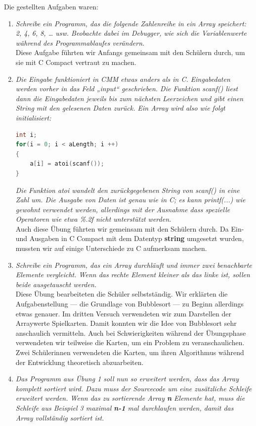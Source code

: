 Die gestellten Aufgaben waren:
\begin{enumerate}
\item \emph{Schreibe ein Programm, das die folgende Zahlenreihe in ein Array speichert: 2, 4, 6, 8, … usw. Beobachte dabei im Debugger, wie sich die Variablenwerte während des Programmablaufes verändern.}\\
Diese Aufgabe führten wir Anfangs gemeinsam mit den Schülern durch, um sie mit C Compact vertraut zu machen.

\item \emph{Die Eingabe funktioniert in CMM etwas anders als in C. Eingabedaten werden vorher in das Feld „input“ geschrieben. Die Funktion scanf() liest dann die Eingabedaten jeweils bis zum nächsten Leerzeichen und gibt einen String mit den gelesenen Daten zurück. Ein Array wird also wie folgt initialisiert:}
\begin{lstlisting}[language=C]
int i;
for(i = 0; i < aLength; i ++)
{
    a[i] = atoi(scanf());
}
\end{lstlisting}
\emph{Die Funktion atoi wandelt den zurückgegebenen String von scanf() in eine Zahl um.
Die Ausgabe von Daten ist genau wie in C; es kann printf(...) wie gewohnt verwendet werden, allerdings mit der Ausnahme dass spezielle Operatoren wie etwa \glqq{}\%.2f\grqq{} nicht unterstützt werden.}\\
Auch diese Übung führten wir gemeinsam mit den Schülern durch. Da Ein- und Ausgaben in C Compact mit dem Datentyp \textbf{string} umgesetzt wurden, mussten wir auf einige Unterschiede zu C aufmerksam machen.

\item \emph{Schreibe ein Programm, das ein Array durchläuft und immer zwei benachbarte Elemente vergleicht. Wenn das rechte Element kleiner als das linke ist, sollen beide ausgetauscht werden.}\\
Diese Übung bearbeiteten die Schüler selbstständig. Wir erklärten die Aufgabenstellung --- die Grundlage von Bubblesort --- zu Beginn allerdings etwas genauer. Im dritten Versuch verwendeten wir zum Darstellen der Arraywerte Spielkarten. Damit konnten wir die Idee von Bubblesort sehr anschaulich vermitteln. Auch bei Schwierigkeiten während der Übungsphase verwendeten wir teilweise die Karten, um ein Problem zu veranschaulichen. Zwei Schülerinnen verwendeten die Karten, um ihren Algorithmus während der Entwicklung theoretisch abzuarbeiten.

\item \emph{Das Programm aus Übung 1 soll nun so erweitert werden, dass das Array komplett sortiert wird. Dazu muss der Sourcecode um eine zusätzliche Schleife erweitert werden. Wenn das zu sortierende Array \textbf{n} Elemente hat, muss die Schleife aus Beispiel 3 maximal \textbf{n-1} mal durchlaufen werden, damit das Array vollständig sortiert ist.}


\end{enumerate}
